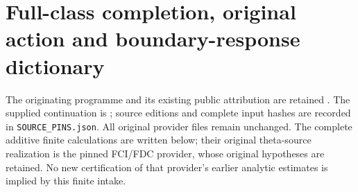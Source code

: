 


\endgroup

\clearpage
\begingroup
\def\im{\operatorname{im}}
\def\diag{\operatorname{diag}}

\setcounter{equation}{0}
\renewcommand{\theequation}{A02NC.\arabic{equation}}
\section*{Full-class completion, original action and boundary-response dictionary}


\begin{abstract}
The actual DNE numerator section has a residue-dual description that omits
nonzero components of every retained simple eigenclass. We construct its
full low, conductor and native completion through every original minor,
calculate its metric and action with all cross terms, and carry the
complete class through the original arithmetic realization. The complete
centered action has an exact rank-two boundary formula at every original
cutoff. Its two boundary rows give precisely the original EC response
ratios, including their signs and both directed leakages. The parity of
the full physical source evaluates the mixed boundary Gram entry exactly
and identifies the product of its two observation amplifications. The
proof retains the original full root polynomial, measure, minimum,
conductor and projection. Absolute determinant allocations and individual
projected arithmetic signs are not evaluated by these finite identities.
\end{abstract}
The originating programme and its existing public attribution are
retained \cite{a02nc:human:globalization2026,a02nc:human:splitzero2026}.
The supplied continuation is \cite{a02nc:prog:arrival02}; source editions and
complete input hashes are recorded in \texttt{SOURCE\_PINS.json}.
All original provider files remain unchanged. The complete additive
finite calculations are written below; their original theta-source
realization is the pinned FCI/FDC provider, whose original hypotheses
are retained. No new certification of that provider's earlier analytic
estimates is implied by this finite intake.

